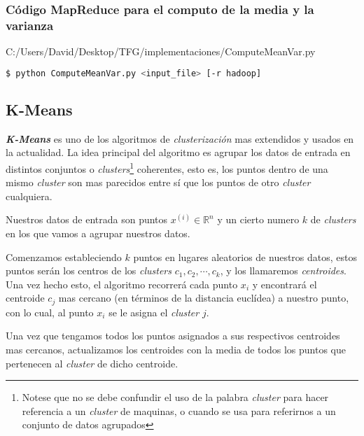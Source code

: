 \newpage  
  
\subsubsection*{Código MapReduce para el computo de la media y la varianza}
  

                {C:/Users/David/Desktop/TFG/implementaciones/ComputeMeanVar.py}

\begin{lstlisting}[language=bash, numbers=none]
$ python ComputeMeanVar.py <input_file> [-r hadoop]
\end{lstlisting}
  
\newpage

\subsection{K-Means}
\textbf{\textit{K-Means}} es uno de los algoritmos de \textit{clusterización} mas 
extendidos y usados en la actualidad. La idea principal del algoritmo es agrupar los datos de entrada 
en distintos conjuntos o \textit{clusters}\footnote{Notese que no se debe confundir el uso de la 
palabra \textit{cluster} para hacer referencia a un \textit{cluster} de maquinas, o cuando se usa 
para referirnos a un conjunto de datos agrupados} 
coherentes, esto es, los puntos dentro de una mismo \textit{cluster} son mas parecidos entre sí 
que los puntos de otro \textit{cluster} cualquiera.
\newline

Nuestros datos de entrada son puntos $x^{(i)} \in \mathds{R}^n$ y un cierto numero $k$ de 
\textit{clusters} en los que vamos a agrupar nuestros datos.

Comenzamos estableciendo $k$ puntos en lugares aleatorios de nuestros datos, estos puntos serán los 
centros de los \textit{clusters} $c_1, c_2, \cdots, c_k$, y los llamaremos \textit{centroides}.
Una vez hecho esto, el algoritmo recorrerá cada punto $x_i$ y encontrará el centroide $c_j$ mas 
cercano (en términos de la distancia euclídea) a nuestro punto, con lo cual, al punto $x_i$ se le 
asigna el \textit{cluster} $j$.

Una vez que tengamos todos los puntos asignados a sus respectivos centroides mas cercanos, actualizamos 
los centroides con la media de todos los puntos que pertenecen al \textit{cluster} de dicho centroide.

